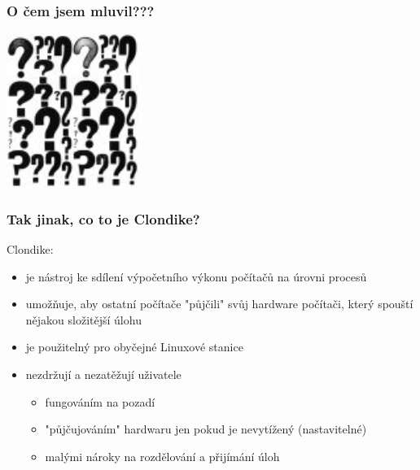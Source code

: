 \documentclass{beamer}
\begin{document}
\begin{frame}
\frametitle{O čem jsem mluvil???}
	\begin {center}
		\includegraphics[height=5cm]{otaznik}
	\end {center}
\end{frame}
\begin {frame}
\frametitle{Tak jinak, co to je Clondike?}
	Clondike:
		\begin {itemize}
			\pause
			\item je nástroj ke sdílení výpočetního výkonu počítačů na úrovni procesů
			\pause
			\item umožňuje, aby ostatní počítače "půjčili" svůj hardware počítači, který spouští nějakou složitější úlohu
			\pause
			\item je použitelný pro obyčejné Linuxové stanice
			\pause
			\item nezdržují a nezatěžují uživatele
			\begin {itemize}
				\item fungováním na pozadí
				\item "půjčujováním" hardwaru jen pokud je nevytížený (nastavitelné)
				\item malými nároky na rozdělování a přijímání úloh
			\end{itemize}
		\end{itemize}
\end {frame}

\end{document}
